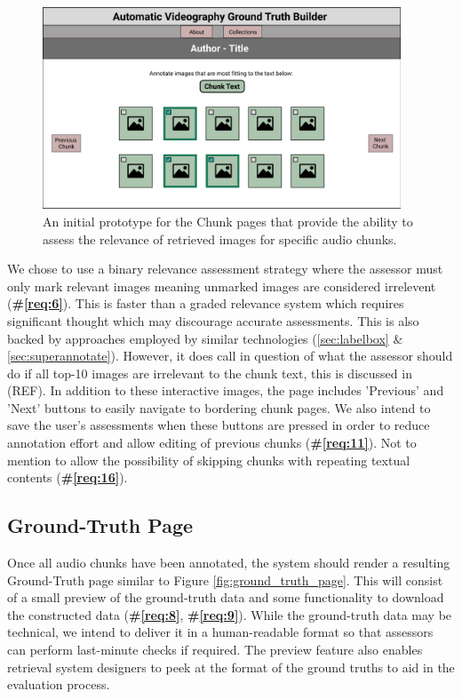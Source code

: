\documentclass{l4proj}
\begin{document}
\begin{figure}
    \centering
    \includegraphics[width=0.95\textwidth]{figures/chunk_page.pdf}
    \caption{An initial prototype for the Chunk pages that provide the ability to assess the relevance of retrieved images for specific audio chunks.}
    \label{fig:chunk_page}
\end{figure}

We chose to use a binary relevance assessment strategy where the assessor must only mark relevant images meaning unmarked images are considered irrelevent (\textbf{\#\ref{req:6}}). This is faster than a graded relevance system which requires significant thought which may discourage accurate assessments. This is also backed by approaches employed by similar technologies (\ref{sec:labelbox} \& \ref{sec:superannotate}). However, it does call in question of what the assessor should do if all top-10 images are irrelevant to the chunk text, this is discussed in (REF). In addition to these interactive images, the page includes 'Previous' and 'Next' buttons to easily navigate to bordering chunk pages. We also intend to save the user's assessments when these buttons are pressed in order to reduce annotation effort and allow editing of previous chunks (\textbf{\#\ref{req:11}}). Not to mention to allow the possibility of skipping chunks with repeating textual contents (\textbf{\#\ref{req:16}}).

\subsection{Ground-Truth Page}
Once all audio chunks have been annotated, the system should render a resulting Ground-Truth page similar to Figure \ref{fig:ground_truth_page}. This will consist of a small preview of the ground-truth data and some functionality to download the constructed data (\textbf{\#\ref{req:8}}, \textbf{\#\ref{req:9}}). While the ground-truth data may be technical, we intend to deliver it in a human-readable format so that assessors can perform last-minute checks if required. The preview feature also enables retrieval system designers to peek at the format of the ground truths to aid in the evaluation process.
\end{document}
